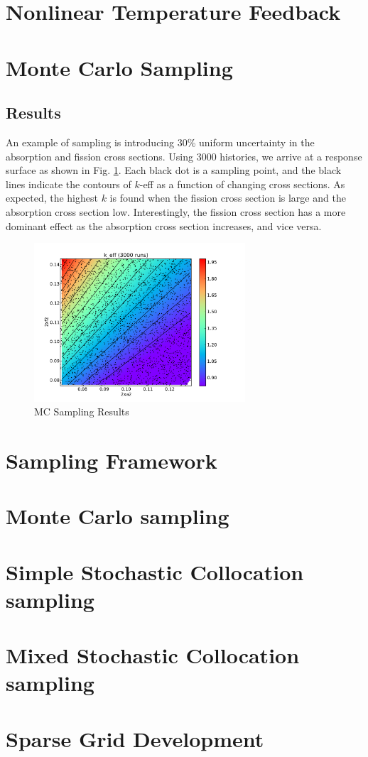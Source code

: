\documentclass[11pt]{article} %
\begin{document}
\section{Nonlinear Temperature Feedback}

\section{Monte Carlo Sampling}
\subsection{Results}
An example of sampling is introducing 30\% uniform uncertainty in the absorption and fission cross sections.  Using 3000 histories, we arrive at a response surface as shown in Fig. \ref{MCres}.  Each black dot is a sampling point, and the black lines indicate the contours of $k$-eff as a function of changing cross sections.  As expected, the highest $k$ is found when the fission cross section is large and the absorption cross section low.  Interestingly, the fission cross section has a more dominant effect as the absorption cross section increases, and vice versa. 
\begin{figure}[h!]
\centering
   \includegraphics[width=0.7\textwidth]{unc_mc_err30_3000runs}
   \caption{MC Sampling Results}
   \label{MCres}
\end{figure}
\section{Sampling Framework}

\section{Monte Carlo sampling}

\section{Simple Stochastic Collocation sampling}

\section{Mixed Stochastic Collocation sampling}

\section{Sparse Grid Development}
\end{document}
